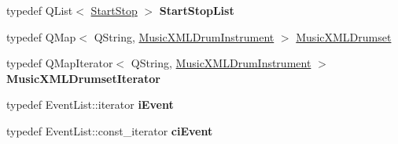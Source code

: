 \begin{DoxyCompactItemize}
typedef Q\+List$<$ \hyperlink{namespace_ms_a53322ca7de949b92f493bb3b6a5fc202}{Start\+Stop} $>$ {\bfseries Start\+Stop\+List}
\item 
typedef Q\+Map$<$ Q\+String, \hyperlink{struct_ms_1_1_music_x_m_l_drum_instrument}{Music\+X\+M\+L\+Drum\+Instrument} $>$ \hyperlink{namespace_ms_a568bb2597ab1d23e4660f255997223c2}{Music\+X\+M\+L\+Drumset}
\item 
\mbox{\label{namespace_ms_aec8bfb2b71c5bb7f9f816cc2cbd51851}} 
typedef Q\+Map\+Iterator$<$ Q\+String, \hyperlink{struct_ms_1_1_music_x_m_l_drum_instrument}{Music\+X\+M\+L\+Drum\+Instrument} $>$ {\bfseries Music\+X\+M\+L\+Drumset\+Iterator}
\item 
\mbox{\label{namespace_ms_acb4e32b5d39e3ccb3048bfc528439f6f}} 
typedef Event\+List\+::iterator {\bfseries i\+Event}
\item 
\mbox{\label{namespace_ms_a3778abf82fad944560b3a0601fd47aa4}} 
typedef Event\+List\+::const\+\_\+iterator {\bfseries ci\+Event}
\end{DoxyCompactItemize}
